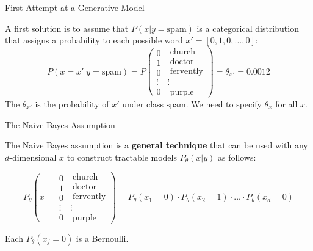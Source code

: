 \documentclass[../../main.tex]{subfiles}
\begin{document}
\begin{frame}[fragile]{First Attempt at a Generative Model}

A first solution is to assume that $P(x|y=\text{spam})$ is a categorical distribution that assigns a probability to each possible word $x'=[0,1,0,...,0]$:
$$
P(x=x'|y=\text{spam}) = P \left( 
\begin{array}{c}
0 \\
1 \\
0 \\
\vdots \\
0 
\end{array}
\right.
\left.
\begin{array}{l}
\;\text{church} \\
\;\text{doctor} \\
\;\text{fervently} \\
\vdots \\
\;\text{purple}
\end{array}
\right) = \theta_{x'} = 0.0012
$$
The $\theta_{x'}$ is the probability of $x'$ under class $\text{spam}$. 
We need to specify $\theta_{x}$ for all $x$.


\end{frame}

\begin{frame}[fragile]{The Naive Bayes Assumption }

The Naive Bayes assumption is a \textbf{general technique} that can be used with any $d$-dimensional $x$ to construct tractable models $P_\theta(x|y)$ as follows:

$$
 P_{\theta} \left( x=
\begin{array}{c}
0 \\
1 \\
0 \\
\vdots \\
0 
\end{array}
\right.
\left.
\begin{array}{l}
\;\text{church} \\
\;\text{doctor} \\
\;\text{fervently} \\
\vdots \\
\;\text{purple}
\end{array}
\right) = P_\theta(x_1=0) \cdot P_\theta(x_2=1) \cdot ... \cdot P_\theta(x_d=0)
$$

Each $P_\theta(x_j=0)$ is a Bernoulli. 

\end{frame}
\end{document}
